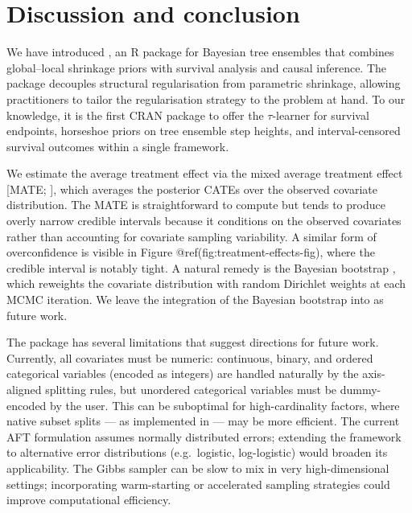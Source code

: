 \section{Discussion and conclusion}\label{discussion-and-conclusion}

We have introduced , an R package for Bayesian tree ensembles that combines global--local shrinkage priors with survival analysis and causal inference. The package decouples structural regularisation from parametric shrinkage, allowing practitioners to tailor the regularisation strategy to the problem at hand. To our knowledge, it is the first CRAN package to offer the \(\tau\)-learner for survival endpoints, horseshoe priors on tree ensemble step heights, and interval-censored survival outcomes within a single framework.

We estimate the average treatment effect via the mixed average treatment effect {[}MATE; \citet{li2023bayesian}{]}, which averages the posterior CATEs over the observed covariate distribution. The MATE is straightforward to compute but tends to produce overly narrow credible intervals because it conditions on the observed covariates rather than accounting for covariate sampling variability. A similar form of overconfidence is visible in Figure @ref(fig:treatment-effects-fig), where the credible interval is notably tight. A natural remedy is the Bayesian bootstrap \citep{rubin1981bayesian}, which reweights the covariate distribution with random Dirichlet weights at each MCMC iteration. We leave the integration of the Bayesian bootstrap into  as future work.

The package has several limitations that suggest directions for future work. Currently, all covariates must be numeric: continuous, binary, and ordered categorical variables (encoded as integers) are handled naturally by the axis-aligned splitting rules, but unordered categorical variables must be dummy-encoded by the user. This can be suboptimal for high-cardinality factors, where native subset splits --- as implemented in  \citep{kapelner2016bartmachine} --- may be more efficient. The current AFT formulation assumes normally distributed errors; extending the framework to alternative error distributions (e.g.~logistic, log-logistic) would broaden its applicability. The Gibbs sampler can be slow to mix in very high-dimensional settings; incorporating warm-starting or accelerated sampling strategies could improve computational efficiency.


